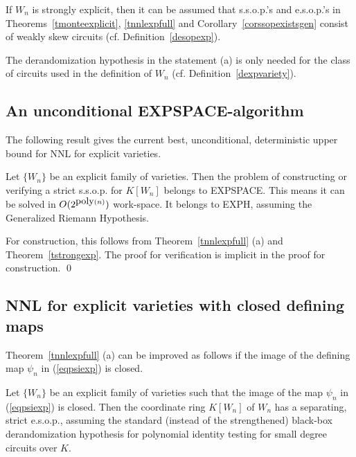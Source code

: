 \documentclass[11pt]{article}
\begin{document}
 If $W_n$ is strongly explicit, then it can be assumed that
s.s.o.p.'s and e.s.o.p.'s in Theorems~\ref{tmonteexplicit}, \ref{tnnlexpfull} and Corollary~\ref{corssopexistsgen}
consist of weakly skew circuits (cf. Definition~\ref{desopexp}). 

 The derandomization  hypothesis in the statement (a) is  only needed 
for the class of circuits used in the definition of $W_n$ (cf. Definition~\ref{dexpvariety}).



\subsection{An unconditional  EXPSPACE-algorithm} \label{sexpunconddet}
The following result gives the current best, unconditional, deterministic upper bound for NNL for explicit varieties.

\begin{theorem} \label{tssopexplicit}
Let $\{W_n\}$ be an explicit family of varieties. Then
the problem of constructing or verifying  a strict  s.s.o.p. for $K[W_n]$ belongs to EXPSPACE. This means it can be solved in 
$O(2^{{\mbox {poly}}(n)})$ work-space.  It belongs to EXPH, assuming  the Generalized Riemann Hypothesis.
\end{theorem}


\proof For construction, this follows from 
Theorem~\ref{tnnlexpfull} (a)  and Theorem~\ref{tstrongexp}. The proof for verification
is implicit in the proof for construction.
\qed 


\subsection{NNL for explicit varieties with closed defining maps} \label{sclosedmap}
Theorem~\ref{tnnlexpfull} (a) can be improved as  follows if the 
image of the defining map $\psi_n$ in (\ref{eqpsiexp}) is closed.


\begin{theorem} \label{tclosedimage}
Let $\{W_n\}$ be an explicit family of varieties such 
that the image of the  map $\psi_n$  in (\ref{eqpsiexp}) is closed.
Then the coordinate ring $K[W_n]$  of $W_n$ has a  separating,  strict  e.s.o.p.,
assuming the standard 
(instead of the strengthened) black-box derandomization
hypothesis for polynomial identity testing for small degree circuits over $K$. 
\end{theorem} 
\end{document}
